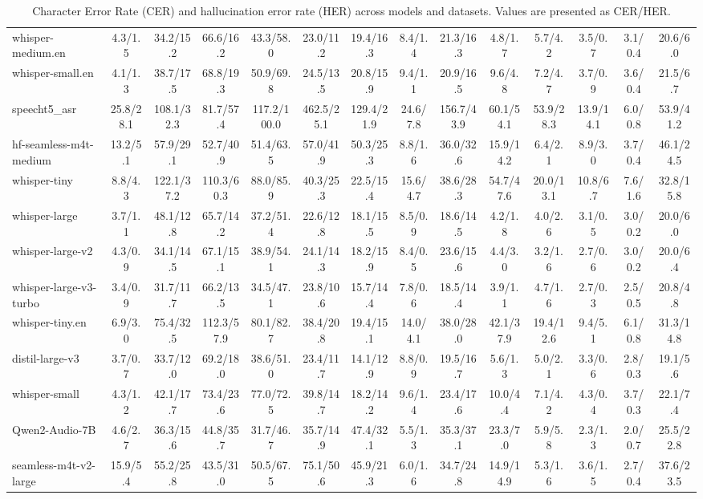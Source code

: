 \begin{table*}[ht!]
{\begin{tabular}{lccccccccccccc}
whisper-medium.en & 4.3/1.5 & 34.2/15.2 & 66.6/16.2 & 43.3/58.0 & 23.0/11.2 & 19.4/16.3 & 8.4/1.4 & 21.3/16.3 & 4.8/1.7 & 5.7/4.2 & 3.5/0.7 & 3.1/0.4 & 20.6/6.0 \\ 
whisper-small.en & 4.1/1.3 & 38.7/17.5 & 68.8/19.3 & 50.9/69.8 & 24.5/13.5 & 20.8/15.9 & 9.4/1.1 & 20.9/16.5 & 9.6/4.8 & 7.2/4.7 & 3.7/0.9 & 3.6/0.4 & 21.5/6.7 \\ 
speecht5\_asr & 25.8/28.1 & 108.1/32.3 & 81.7/57.4 & 117.2/100.0 & 462.5/25.1 & 129.4/21.9 & 24.6/7.8 & 156.7/43.9 & 60.1/54.1 & 53.9/28.3 & 13.9/14.1 & 6.0/0.8 & 53.9/41.2 \\ 
hf-seamless-m4t-medium & 13.2/5.1 & 57.9/29.1 & 52.7/40.9 & 51.4/63.5 & 57.0/41.9 & 50.3/25.3 & 8.8/1.6 & 36.0/32.6 & 15.9/14.2 & 6.4/2.1 & 8.9/3.0 & 3.7/0.4 & 46.1/24.5 \\ 
whisper-tiny & 8.8/4.3 & 122.1/37.2 & 110.3/60.3 & 88.0/85.9 & 40.3/25.3 & 22.5/15.4 & 15.6/4.7 & 38.6/28.3 & 54.7/47.6 & 20.0/13.1 & 10.8/6.7 & 7.6/1.6 & 32.8/15.8 \\ 
whisper-large & 3.7/1.1 & 48.1/12.8 & 65.7/14.2 & 37.2/51.4 & 22.6/12.8 & 18.1/15.5 & 8.5/0.9 & 18.6/14.5 & 4.2/1.8 & 4.0/2.6 & 3.1/0.5 & 3.0/0.2 & 20.0/6.0 \\ 
whisper-large-v2 & 4.3/0.9 & 34.1/14.5 & 67.1/15.1 & 38.9/54.1 & 24.1/14.3 & 18.2/15.9 & 8.4/0.5 & 23.6/15.6 & 4.4/3.0 & 3.2/1.6 & 2.7/0.6 & 3.0/0.2 & 20.0/6.4 \\ 
whisper-large-v3-turbo & 3.4/0.9 & 31.7/11.7 & 66.2/13.5 & 34.5/47.1 & 23.8/10.6 & 15.7/14.4 & 7.8/0.6 & 18.5/14.4 & 3.9/1.1 & 4.7/1.6 & 2.7/0.3 & 2.5/0.5 & 20.8/4.8 \\ 
whisper-tiny.en & 6.9/3.0 & 75.4/32.5 & 112.3/57.9 & 80.1/82.7 & 38.4/20.8 & 19.4/15.1 & 14.0/4.1 & 38.0/28.0 & 42.1/37.9 & 19.4/12.6 & 9.4/5.1 & 6.1/0.8 & 31.3/14.8 \\ 
distil-large-v3 & 3.7/0.7 & 33.7/12.0 & 69.2/18.0 & 38.6/51.0 & 23.4/11.7 & 14.1/12.9 & 8.8/0.9 & 19.5/16.7 & 5.6/1.3 & 5.0/2.1 & 3.3/0.6 & 2.8/0.3 & 19.1/5.6 \\ 
whisper-small & 4.3/1.2 & 42.1/17.7 & 73.4/23.6 & 77.0/72.5 & 39.8/14.7 & 18.2/14.2 & 9.6/1.4 & 23.4/17.6 & 10.0/4.4 & 7.1/4.2 & 4.3/0.4 & 3.7/0.3 & 22.1/7.4 \\ 
Qwen2-Audio-7B & 4.6/2.7 & 36.3/15.6 & 44.8/35.7 & 31.7/46.7 & 35.7/14.9 & 47.4/32.1 & 5.5/1.3 & 35.3/37.1 & 23.3/7.0 & 5.9/5.8 & 2.3/1.3 & 2.0/0.7 & 25.5/22.8 \\ 
seamless-m4t-v2-large & 15.9/5.4 & 55.2/25.8 & 43.5/31.0 & 50.5/67.5 & 75.1/50.6 & 45.9/21.3 & 6.0/1.6 & 34.7/24.8 & 14.9/14.9 & 5.3/1.6 & 3.6/1.5 & 2.7/0.4 & 37.6/23.5 \\ 
\bottomrule
\end{tabular}
}
\caption{Character Error Rate (CER) and hallucination error rate (HER) across models and datasets. Values are presented as CER/HER.}
\label{tab:results_benchmark}
\end{table*}